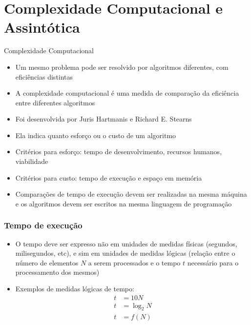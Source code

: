 \section{Complexidade Computacional e Assintótica}

\begin{frame}[fragile]{Complexidade Computacional}

	\begin{itemize}
		\item Um mesmo problema pode ser resolvido por algoritmos diferentes, com eficiências 
        distintas

		\item A complexidade computacional é uma medida de comparação da eficiência entre
        diferentes algoritmos

		\item Foi desenvolvida por Juris Hartmanis e Richard E. Stearns

		\item Ela indica quanto esforço ou o custo de um algoritmo

		\item Critérios para esforço: tempo de desenvolvimento, recursos humanos, viabilidade

		\item Critérios para custo: tempo de execução e espaço em memória

		\item Comparações de tempo de execução devem ser realizadas na mesma máquina e os 
        algoritmos devem ser escritos na mesma linguagem de programação
	\end{itemize}

\end{frame}

\begin{frame}[fragile]\frametitle{Tempo de execução}

	\begin{itemize}
		\item O tempo deve ser expresso não em unidades de medidas físicas (segundos, milisegundos, 
        etc), e sim em unidades de medidas lógicas (relação entre o número de elementos $N$ a serem 
        processados e o tempo $t$ necessário para o processamento dos mesmos)
		
		\item Exemplos de medidas lógicas de tempo:
        \begin{align*}
        t &= 10N \\
        t &= \log_2 N \\
        t &= f(N)
        \end{align*}
    
	\end{itemize}

\end{frame}

